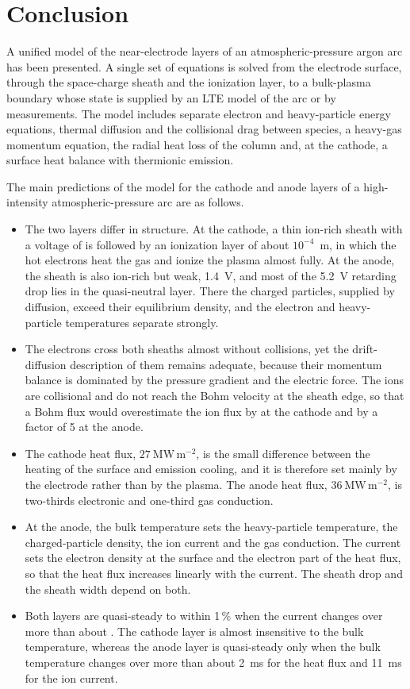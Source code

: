 \section{Conclusion}
\label{sec:conclusion}

A unified  model of the near-electrode layers of an atmospheric-pressure argon arc has been presented. A single set of equations is solved from the electrode surface, through the space-charge sheath and the ionization layer, to a bulk-plasma boundary whose state is supplied by an LTE model of the arc or by measurements. The model includes separate electron and heavy-particle energy equations, thermal diffusion and the collisional drag between species, a heavy-gas momentum equation, the radial heat loss of the column and, at the cathode, a surface heat balance with thermionic emission.

The main predictions of the model for the cathode and anode layers of a high-intensity atmospheric-pressure arc are as follows.
\begin{itemize}
\item The two layers differ in structure. At the cathode, a thin ion-rich sheath with a voltage of  is followed by an ionization layer of about \(10^{-4}\)~m, in which the hot electrons heat the gas and ionize the plasma almost fully. At the anode, the sheath is also ion-rich but weak, 1.4~V, and most of the 5.2~V retarding drop lies in the quasi-neutral layer. There the charged particles, supplied by diffusion, exceed their equilibrium density, and the electron and heavy-particle temperatures separate strongly.
\item The electrons cross both sheaths almost without collisions, yet the drift-diffusion description of them remains adequate, because their momentum balance is dominated by the pressure gradient and the electric force. The ions are collisional and do not reach the Bohm velocity at the sheath edge, so that a Bohm flux would overestimate the ion flux by  at the cathode and by a factor of 5 at the anode.
\item The cathode heat flux, \(27\ \mathrm{MW\,m^{-2}}\), is the small difference between the heating of the surface and emission cooling, and it is therefore set mainly by the electrode rather than by the plasma. The anode heat flux, \(36\ \mathrm{MW\,m^{-2}}\), is two-thirds electronic and one-third gas conduction.
\item At the anode, the bulk temperature sets the heavy-particle temperature, the charged-particle density, the ion current and the gas conduction. The current sets the electron density at the surface and the electron part of the heat flux, so that the heat flux increases linearly with the current. The sheath drop and the sheath width depend on both.
\item Both layers are quasi-steady to within 1\,\% when the current changes over more than about . The cathode layer is almost insensitive to the bulk temperature, whereas the anode layer is quasi-steady only when the bulk temperature changes over more than about 2~ms for the heat flux and 11~ms for the ion current.
\end{itemize}

